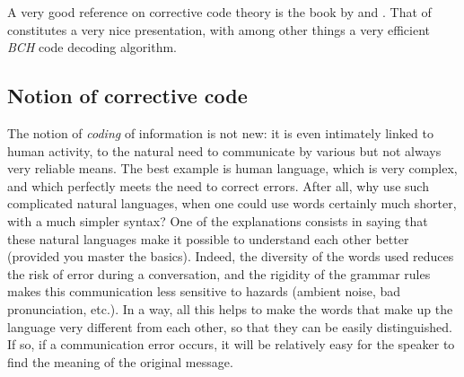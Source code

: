  
 A very good reference on corrective code theory is the book by  and  \cite{papini}. That of  \cite{demazure} constitutes a very nice presentation, with among other things a very efficient \textit{BCH} code decoding algorithm.
\subsection{Notion of corrective code}
 
 
The notion of \textit{coding} of information is not new: it is even intimately linked to human activity, to the natural need to communicate by various but not always very reliable means. The best example is human language, which is very complex, and which perfectly meets the need to correct errors. After all, why use such complicated natural languages, when one could use words certainly much shorter, with a much simpler syntax? One of the explanations consists in saying that these natural languages make it possible to understand each other better (provided you master the basics). Indeed, the diversity of the words used reduces the risk of error during a conversation, and the rigidity of the grammar rules makes this communication less sensitive to hazards (ambient noise, bad pronunciation, etc.). In a way, all this helps to make the words that make up the language very different from each other, so that they can be easily distinguished. If so, if a communication error occurs, it will be relatively easy for the speaker to find the meaning of the original message.
 
